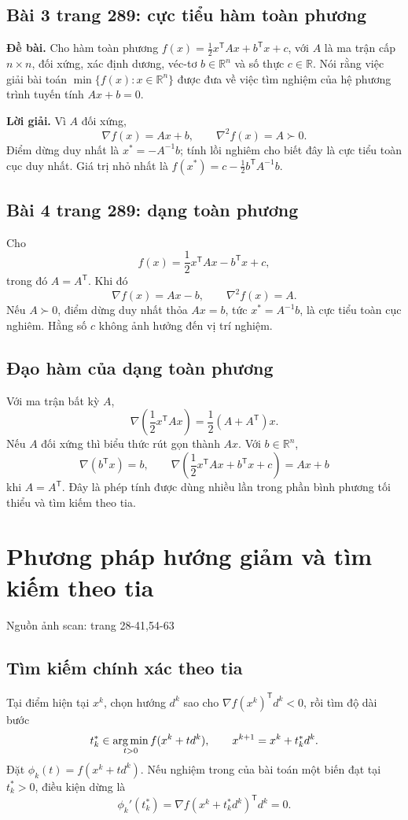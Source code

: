 \documentclass[11pt,a4paper]{article}
\newcommand{\R}{\mathbb{R}}
\newcommand{\grad}{\nabla}
\newcommand{\Hess}{\nabla^2}
\newcommand{\T}{^{\mathsf T}}
\newcommand{\src}[1]{\hfill{\footnotesize\color{gray}Nguồn ảnh scan: trang #1}}
\newcommand{\argmin}{\mathop{\rm arg\,min}}
\begin{document}
\subsection{Bài 3 trang 289: cực tiểu hàm toàn phương}
\textbf{Đề bài.} Cho hàm toàn phương \(f(x)=\frac12x\T Ax+b\T x+c\), với \(A\) là ma trận cấp \(n\times n\), đối xứng, xác định dương, véc-tơ \(b\in\R^n\) và số thực \(c\in\R\). Nói rằng việc giải bài toán \(\min\{f(x):x\in\R^n\}\) được đưa về việc tìm nghiệm của hệ phương trình tuyến tính \(Ax+b=0\).

\textbf{Lời giải.} Vì \(A\) đối xứng,
\[
\grad f(x)=Ax+b,\qquad \Hess f(x)=A\succ0.
\]
Điểm dừng duy nhất là \(x^*=-A^{-1}b\); tính lồi nghiêm cho biết đây là cực tiểu toàn cục duy nhất. Giá trị nhỏ nhất là \(f(x^*)=c-\frac12b\T A^{-1}b\).

\subsection{Bài 4 trang 289: dạng toàn phương}
Cho
\[
f(x)=\frac12 x\T A x-b\T x+c,
\]
trong đó \(A=A\T\). Khi đó
\[
\grad f(x)=Ax-b,\qquad \Hess f(x)=A.
\]
Nếu \(A\succ0\), điểm dừng duy nhất thỏa \(Ax=b\), tức \(x^*=A^{-1}b\), là cực tiểu toàn cục nghiêm. Hằng số \(c\) không ảnh hưởng đến vị trí nghiệm.

\subsection{Đạo hàm của dạng toàn phương}
Với ma trận bất kỳ \(A\),
\[
\grad\left(\frac12x\T A x\right)=\frac12(A+A\T)x.
\]
Nếu \(A\) đối xứng thì biểu thức rút gọn thành \(Ax\). Với \(b\in\R^n\),
\[
\grad(b\T x)=b,\qquad
\grad\left(\frac12x\T A x+b\T x+c\right)=Ax+b
\]
khi \(A=A\T\). Đây là phép tính được dùng nhiều lần trong phần bình phương tối thiểu và tìm kiếm theo tia.

\section{Phương pháp hướng giảm và tìm kiếm theo tia}
\src{28-41,54-63}

\subsection{Tìm kiếm chính xác theo tia}
Tại điểm hiện tại \(x^k\), chọn hướng \(d^k\) sao cho \(\grad f(x^k)\T d^k<0\), rồi tìm độ dài bước
\[
t_k^*\in\argmin_{t>0} f(x^k+t d^k),\qquad
x^{k+1}=x^k+t_k^*d^k.
\]
Đặt \(\phi_k(t)=f(x^k+t d^k)\). Nếu nghiệm trong của bài toán một biến đạt tại \(t_k^*>0\), điều kiện dừng là
\[
\phi_k'(t_k^*)=\grad f(x^k+t_k^*d^k)\T d^k=0.
\]
\end{document}
